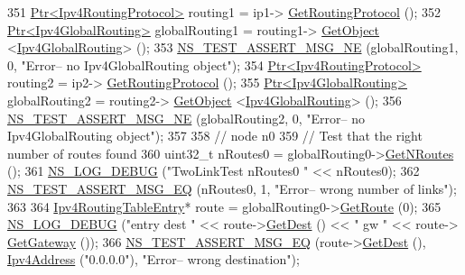 \begin{DoxyCode}
351   \hyperlink{classns3_1_1Ptr}{Ptr<Ipv4RoutingProtocol>} routing1 = ip1->
      \hyperlink{classns3_1_1Ipv4L3Protocol_aa1e4efbf4978299e47406895c3f4b41d}{GetRoutingProtocol} ();
352   \hyperlink{classns3_1_1Ptr}{Ptr<Ipv4GlobalRouting>} globalRouting1 = routing1->
      \hyperlink{classns3_1_1Object_a13e18c00017096c8381eb651d5bd0783}{GetObject} <\hyperlink{classns3_1_1Ipv4GlobalRouting}{Ipv4GlobalRouting}> ();
353   \hyperlink{group__testing_ga73d66fb0050a5111453fd144e767b91a}{NS\_TEST\_ASSERT\_MSG\_NE} (globalRouting1, 0, \textcolor{stringliteral}{"Error-- no Ipv4GlobalRouting object"});  
354   \hyperlink{classns3_1_1Ptr}{Ptr<Ipv4RoutingProtocol>} routing2 = ip2->
      \hyperlink{classns3_1_1Ipv4L3Protocol_aa1e4efbf4978299e47406895c3f4b41d}{GetRoutingProtocol} ();
355   \hyperlink{classns3_1_1Ptr}{Ptr<Ipv4GlobalRouting>} globalRouting2 = routing2->
      \hyperlink{classns3_1_1Object_a13e18c00017096c8381eb651d5bd0783}{GetObject} <\hyperlink{classns3_1_1Ipv4GlobalRouting}{Ipv4GlobalRouting}> ();
356   \hyperlink{group__testing_ga73d66fb0050a5111453fd144e767b91a}{NS\_TEST\_ASSERT\_MSG\_NE} (globalRouting2, 0, \textcolor{stringliteral}{"Error-- no Ipv4GlobalRouting object"});  
357 
358   \textcolor{comment}{// node n0}
359   \textcolor{comment}{// Test that the right number of routes found}
360   uint32\_t nRoutes0 = globalRouting0->\hyperlink{classns3_1_1Ipv4GlobalRouting_abb9d2b3642272b9bd2697a5699922fa7}{GetNRoutes} ();
361   \hyperlink{group__logging_ga413f1886406d49f59a6a0a89b77b4d0a}{NS\_LOG\_DEBUG} (\textcolor{stringliteral}{"TwoLinkTest nRoutes0 "} << nRoutes0);
362   \hyperlink{group__testing_ga2a9d78cffb3db8e867c35fff0b698cf5}{NS\_TEST\_ASSERT\_MSG\_EQ} (nRoutes0, 1, \textcolor{stringliteral}{"Error-- wrong number of links"});
363 
364   \hyperlink{classns3_1_1Ipv4RoutingTableEntry}{Ipv4RoutingTableEntry}* route = globalRouting0->\hyperlink{classns3_1_1Ipv4GlobalRouting_accd518b9888908dbea189c1d1c73dcf1}{GetRoute} (0);
365   \hyperlink{group__logging_ga413f1886406d49f59a6a0a89b77b4d0a}{NS\_LOG\_DEBUG} (\textcolor{stringliteral}{"entry dest "} << route->\hyperlink{classns3_1_1Ipv4RoutingTableEntry_adcd2084c5f0261c43c059c2b981e91fa}{GetDest} () << \textcolor{stringliteral}{" gw "} << route->
      \hyperlink{classns3_1_1Ipv4RoutingTableEntry_a49dda51e0ba3c78bc969a9378bd15893}{GetGateway} ());
366   \hyperlink{group__testing_ga2a9d78cffb3db8e867c35fff0b698cf5}{NS\_TEST\_ASSERT\_MSG\_EQ} (route->\hyperlink{classns3_1_1Ipv4RoutingTableEntry_adcd2084c5f0261c43c059c2b981e91fa}{GetDest} (), 
      \hyperlink{classns3_1_1Ipv4Address}{Ipv4Address} (\textcolor{stringliteral}{"0.0.0.0"}), \textcolor{stringliteral}{"Error-- wrong destination"});

\end{DoxyCode}
